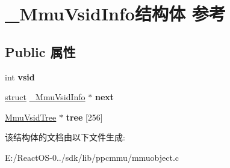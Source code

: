 \hypertarget{struct___mmu_vsid_info}{}\section{\+\_\+\+Mmu\+Vsid\+Info结构体 参考}
\label{struct___mmu_vsid_info}
\subsection*{Public 属性}
\begin{DoxyCompactItemize}
\item 
\mbox{\label{struct___mmu_vsid_info_abc98dd9b00e926bf49435ff79875e696}} 
int {\bfseries vsid}
\item 
\mbox{\label{struct___mmu_vsid_info_a00f2865fb62e3182af22b37d4b21a2db}} 
\hyperlink{interfacestruct}{struct} \hyperlink{struct___mmu_vsid_info}{\+\_\+\+Mmu\+Vsid\+Info} $\ast$ {\bfseries next}
\item 
\mbox{\label{struct___mmu_vsid_info_a12c8c8b712d6b92fd66f1c4428beb374}} 
\hyperlink{struct___mmu_vsid_tree}{Mmu\+Vsid\+Tree} $\ast$ {\bfseries tree} \mbox{[}256\mbox{]}
\end{DoxyCompactItemize}


该结构体的文档由以下文件生成\+:\begin{DoxyCompactItemize}
\item 
E\+:/\+React\+O\+S-\/0../sdk/lib/ppcmmu/mmuobject.\+c\end{DoxyCompactItemize}

